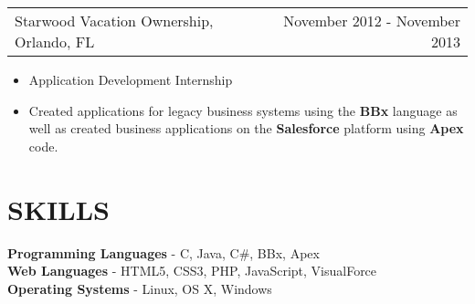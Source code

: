 \documentclass[margin]{res}
\begin{document}
\begin{resume}
			\begin{tabular}{p{3in} r}
				Starwood Vacation Ownership, Orlando, FL & November 2012 - November 2013
			\end{tabular}
			\begin{itemize}[noitemsep,nolistsep,leftmargin=0.16cm]
				\item[] Application Development Internship
				\item[] Created applications for legacy business systems using the
						{\bf BBx} language as well as created business applications
						on the {\bf Salesforce} platform using {\bf Apex} code.
			\end{itemize}

\section{SKILLS}
			{\bf Programming Languages} - C, Java, C\#, BBx, Apex				\\
			{\bf Web Languages} - HTML5, CSS3, PHP, JavaScript, VisualForce	\\
			{\bf Operating Systems} - Linux, OS X, Windows


\end{resume}
\end{document}
